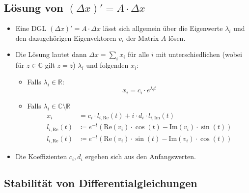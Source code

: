 \documentclass[a4paper, 11pt, accentcolor = tud3b]{tudreport}
\renewcommand{\Re}{\text{Re}}
\renewcommand{\Im}{\text{Im}}
\begin{document}
            \subsection{Lösung von \( (\Delta x)' = A \cdot \Delta x \)} %
	            \begin{itemize}
	            	\item Eine DGL \( (\Delta x)' = A \cdot \Delta x \) lässt sich allgemein über die Eigenwerte \( \lambda _ i \) und den dazugehörigen Eigenvektoren \( v _ i \) der Matrix \(A\) lösen.
	            	\item Die Lösung lautet dann \( \Delta x = \sum _ i x _ i \) für alle \( i \) mit unterschiedlichen (wobei für \( z \in \mathbb{C} \) gilt \( z = \bar{z} \)) \( \lambda _ i \) und folgenden \( x _ i \):
		            	\begin{itemize}
			            	\item Falls \( \lambda _ i \in \mathbb{R} \):
				            	\begin{equation*}
					            	x _ i = c _ i \cdot e ^ { \lambda _ i t }
				            	\end{equation*}
				            \item Falls \( \lambda _ i \in \mathbb{C} \setminus \mathbb{R} \)
					            \begin{align*}
						            x _ i &= c _ i \cdot l _ { i, \Re } (t) + i \cdot d _ i \cdot l _ { i, \Im } (t) \\
						            l _ { i, \Re } (t) &\coloneqq e ^ {-t} (\Re(v _ i) \cdot \cos(t) - \Im(v _ i) \cdot \sin(t)) \\
						            l _ { i, \Re } (t) &\coloneqq e ^ {-t} (\Re(v _ i) \cdot \sin(t) - \Im(v _ i) \cdot \cos(t))
					            \end{align*}
		            	\end{itemize}
		            \item Die Koeffizienten \( c _ i, d _ i \) ergeben sich aus den Anfangswerten.
	            \end{itemize}

            \subsection{Stabilität von Differentialgleichungen} %
	            \label{sec:stability_dgl}
            
\end{document}

